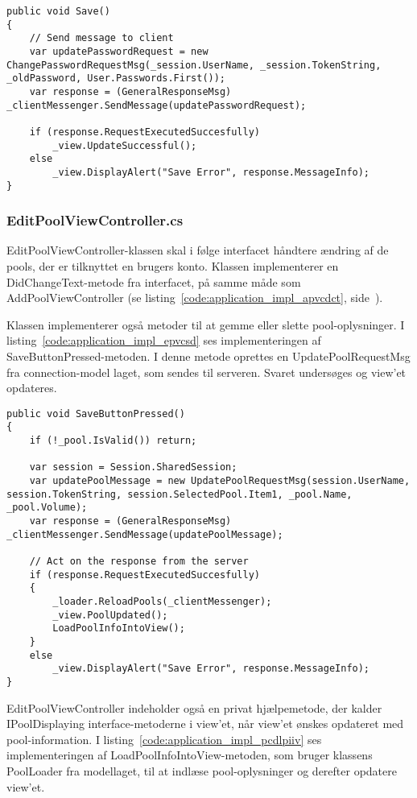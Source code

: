 \begin{lstlisting}[caption={Save()},label={code:application_impl_euvcsave}]
public void Save()
{
	// Send message to client
	var updatePasswordRequest = new ChangePasswordRequestMsg(_session.UserName, _session.TokenString, _oldPassword, User.Passwords.First());
	var response = (GeneralResponseMsg) _clientMessenger.SendMessage(updatePasswordRequest);

	if (response.RequestExecutedSuccesfully)
		_view.UpdateSuccessful();
	else
		_view.DisplayAlert("Save Error", response.MessageInfo);
}
\end{lstlisting}

\subsubsection{EditPoolViewController.cs}
EditPoolViewController-klassen skal i følge interfacet håndtere ændring af de pools, der er tilknyttet en brugers konto. Klassen implementerer en DidChangeText-metode fra interfacet, på samme måde som AddPoolViewController (se listing~\ref{code:application_impl_apvcdct}, side~\pageref{code:application_impl_apvcdct}).

Klassen implementerer også metoder til at gemme eller slette pool-oplysninger. I listing~\ref{code:application_impl_epvcsd} ses implementeringen af SaveButtonPressed-metoden. I denne metode oprettes en UpdatePoolRequestMsg fra connection-model laget, som sendes til serveren. Svaret undersøges og view'et opdateres.

\begin{lstlisting}[caption={SaveButtonPressed()},label={code:application_impl_epvcsd}]
public void SaveButtonPressed()
{
	if (!_pool.IsValid()) return;

	var session = Session.SharedSession;
	var updatePoolMessage = new UpdatePoolRequestMsg(session.UserName, session.TokenString, session.SelectedPool.Item1, _pool.Name, _pool.Volume);
	var response = (GeneralResponseMsg) _clientMessenger.SendMessage(updatePoolMessage);

	// Act on the response from the server
	if (response.RequestExecutedSuccesfully)
	{
		_loader.ReloadPools(_clientMessenger);
		_view.PoolUpdated();
		LoadPoolInfoIntoView();
	}
	else
		_view.DisplayAlert("Save Error", response.MessageInfo);
}
\end{lstlisting}

EditPoolViewController indeholder også en privat hjælpemetode, der kalder IPoolDisplaying interface-metoderne i view'et, når view'et ønskes opdateret med pool-information. I listing~\ref{code:application_impl_pcdlpiiv} ses implementeringen af LoadPoolInfoIntoView-metoden, som bruger klassens PoolLoader fra modellaget, til at indlæse pool-oplysninger og derefter opdatere view'et.

